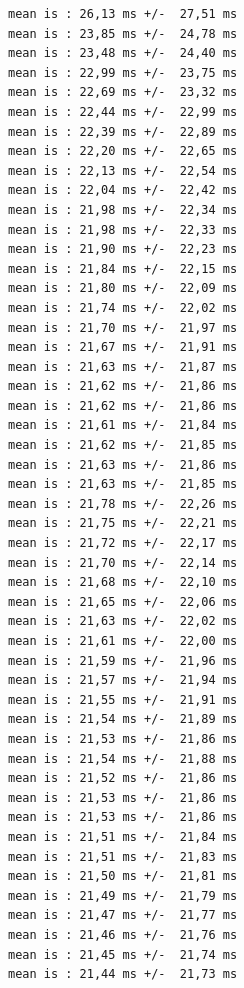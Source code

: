 \begin{lstlisting}
mean is : 26,13 ms +/-  27,51 ms
mean is : 23,85 ms +/-  24,78 ms
mean is : 23,48 ms +/-  24,40 ms
mean is : 22,99 ms +/-  23,75 ms
mean is : 22,69 ms +/-  23,32 ms
mean is : 22,44 ms +/-  22,99 ms
mean is : 22,39 ms +/-  22,89 ms
mean is : 22,20 ms +/-  22,65 ms
mean is : 22,13 ms +/-  22,54 ms
mean is : 22,04 ms +/-  22,42 ms
mean is : 21,98 ms +/-  22,34 ms
mean is : 21,98 ms +/-  22,33 ms
mean is : 21,90 ms +/-  22,23 ms
mean is : 21,84 ms +/-  22,15 ms
mean is : 21,80 ms +/-  22,09 ms
mean is : 21,74 ms +/-  22,02 ms
mean is : 21,70 ms +/-  21,97 ms
mean is : 21,67 ms +/-  21,91 ms
mean is : 21,63 ms +/-  21,87 ms
mean is : 21,62 ms +/-  21,86 ms
mean is : 21,62 ms +/-  21,86 ms
mean is : 21,61 ms +/-  21,84 ms
mean is : 21,62 ms +/-  21,85 ms
mean is : 21,63 ms +/-  21,86 ms
mean is : 21,63 ms +/-  21,85 ms
mean is : 21,78 ms +/-  22,26 ms
mean is : 21,75 ms +/-  22,21 ms
mean is : 21,72 ms +/-  22,17 ms
mean is : 21,70 ms +/-  22,14 ms
mean is : 21,68 ms +/-  22,10 ms
mean is : 21,65 ms +/-  22,06 ms
mean is : 21,63 ms +/-  22,02 ms
mean is : 21,61 ms +/-  22,00 ms
mean is : 21,59 ms +/-  21,96 ms
mean is : 21,57 ms +/-  21,94 ms
mean is : 21,55 ms +/-  21,91 ms
mean is : 21,54 ms +/-  21,89 ms
mean is : 21,53 ms +/-  21,86 ms
mean is : 21,54 ms +/-  21,88 ms
mean is : 21,52 ms +/-  21,86 ms
mean is : 21,53 ms +/-  21,86 ms
mean is : 21,53 ms +/-  21,86 ms
mean is : 21,51 ms +/-  21,84 ms
mean is : 21,51 ms +/-  21,83 ms
mean is : 21,50 ms +/-  21,81 ms
mean is : 21,49 ms +/-  21,79 ms
mean is : 21,47 ms +/-  21,77 ms
mean is : 21,46 ms +/-  21,76 ms
mean is : 21,45 ms +/-  21,74 ms
mean is : 21,44 ms +/-  21,73 ms
\end{lstlisting}



